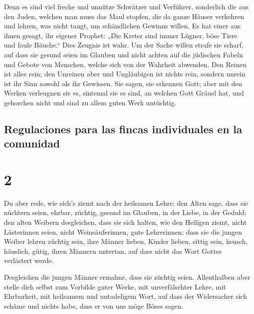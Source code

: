  Denn es sind viel freche und unnütze Schwätzer und
Verführer, sonderlich die aus den Juden,  welchen man
muss das Maul stopfen, die da ganze Häuser verkehren und lehren, was
nicht taugt, um schändlichen Gewinns willen.  Es hat
einer aus ihnen gesagt, ihr eigener Prophet: „Die Kreter sind immer
Lügner, böse Tiere und faule Bäuche.``  Dies Zeugnis ist
wahr. Um der Sache willen strafe sie scharf, auf dass sie gesund seien
im Glauben  und nicht achten auf die jüdischen Fabeln und
Gebote von Menschen, welche sich von der Wahrheit abwenden.
 Den Reinen ist alles rein; den Unreinen aber und
Ungläubigen ist nichts rein, sondern unrein ist ihr Sinn sowohl als ihr
Gewissen.  Sie sagen, sie erkennen Gott; aber mit den
Werken verleugnen sie es, sintemal sie es sind, an welchen Gott Gräuel
hat, und gehorchen nicht und sind zu allem guten Werk untüchtig.

\hypertarget{regulaciones-para-las-fincas-individuales-en-la-comunidad}{%
\subsection{Regulaciones para las fincas individuales en la
comunidad}\label{regulaciones-para-las-fincas-individuales-en-la-comunidad}}

\hypertarget{section-1}{%
\section{2}\label{section-1}}

 Du aber rede, wie sich's ziemt nach der heilsamen Lehre:
 den Alten sage, dass sie nüchtern seien, ehrbar, züchtig,
gesund im Glauben, in der Liebe, in der Geduld;  den alten
Weibern desgleichen, dass sie sich halten, wie den Heiligen ziemt, nicht
Lästerinnen seien, nicht Weinsäuferinnen, gute Lehrerinnen;
 dass sie die jungen Weiber lehren züchtig sein, ihre
Männer lieben, Kinder lieben,  sittig sein, keusch,
häuslich, gütig, ihren Männern untertan, auf dass nicht das Wort Gottes
verlästert werde.

 Desgleichen die jungen Männer ermahne, dass sie züchtig
seien.  Allenthalben aber stelle dich selbst zum Vorbilde
guter Werke, mit unverfälschter Lehre, mit Ehrbarkeit, 
mit heilsamem und untadeligem Wort, auf dass der Widersacher sich schäme
und nichts habe, dass er von uns möge Böses sagen.

